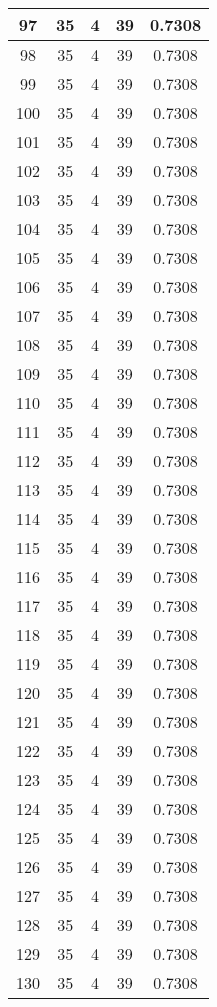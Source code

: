 \documentclass[letterpaper, 12pt]{article}
\begin{document}
\begin{longtable}{|c|c|c|c|c|}
\hline
97 & 35 & 4 & 39 & 0.7308 \\
\hline
98 & 35 & 4 & 39 & 0.7308 \\
\hline
99 & 35 & 4 & 39 & 0.7308 \\
\hline
100 & 35 & 4 & 39 & 0.7308 \\
\hline
101 & 35 & 4 & 39 & 0.7308 \\
\hline
102 & 35 & 4 & 39 & 0.7308 \\
\hline
103 & 35 & 4 & 39 & 0.7308 \\
\hline
104 & 35 & 4 & 39 & 0.7308 \\
\hline
105 & 35 & 4 & 39 & 0.7308 \\
\hline
106 & 35 & 4 & 39 & 0.7308 \\
\hline
107 & 35 & 4 & 39 & 0.7308 \\
\hline
108 & 35 & 4 & 39 & 0.7308 \\
\hline
109 & 35 & 4 & 39 & 0.7308 \\
\hline
110 & 35 & 4 & 39 & 0.7308 \\
\hline
111 & 35 & 4 & 39 & 0.7308 \\
\hline
112 & 35 & 4 & 39 & 0.7308 \\
\hline
113 & 35 & 4 & 39 & 0.7308 \\
\hline
114 & 35 & 4 & 39 & 0.7308 \\
\hline
115 & 35 & 4 & 39 & 0.7308 \\
\hline
116 & 35 & 4 & 39 & 0.7308 \\
\hline
117 & 35 & 4 & 39 & 0.7308 \\
\hline
118 & 35 & 4 & 39 & 0.7308 \\
\hline
119 & 35 & 4 & 39 & 0.7308 \\
\hline
120 & 35 & 4 & 39 & 0.7308 \\
\hline
121 & 35 & 4 & 39 & 0.7308 \\
\hline
122 & 35 & 4 & 39 & 0.7308 \\
\hline
123 & 35 & 4 & 39 & 0.7308 \\
\hline
124 & 35 & 4 & 39 & 0.7308 \\
\hline
125 & 35 & 4 & 39 & 0.7308 \\
\hline
126 & 35 & 4 & 39 & 0.7308 \\
\hline
127 & 35 & 4 & 39 & 0.7308 \\
\hline
128 & 35 & 4 & 39 & 0.7308 \\
\hline
129 & 35 & 4 & 39 & 0.7308 \\
\hline
130 & 35 & 4 & 39 & 0.7308 \\

\end{longtable}
\end{document}
